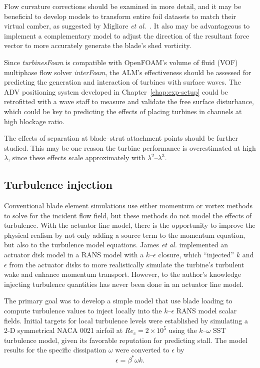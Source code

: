 Flow curvature corrections should be examined in more detail, and it may be
beneficial to develop models to transform entire foil datasets to match their
virtual camber, as suggested by Migliore \emph{et al.}~\cite{Migliore1980}. It
also may be advantageous to implement a complementary model to adjust the
direction of the resultant force vector to more accurately generate the blade's
shed vorticity.

Since \textit{turbinesFoam} is compatible with OpenFOAM's volume of fluid (VOF)
multiphase flow solver \textit{interFoam}, the ALM's effectiveness should be
assessed for predicting the generation and interaction of turbines with surface
waves. The ADV positioning system developed in Chapter~\ref{chap:exp-setup}
could be retrofitted with a wave staff to measure and validate the free surface
disturbance, which could be key to predicting the effects of placing turbines in
channels at high blockage ratio.

The effects of separation at blade--strut attachment points should be further
studied. This may be one reason the turbine performance is overestimated at high
$\lambda$, since these effects scale approximately with
$\lambda^2$--$\lambda^3$.


\subsection{Turbulence injection}

Conventional blade element simulations use either momentum or vortex methods to
solve for the incident flow field, but these methods do not model the effects of
turbulence. With the actuator line model, there is the opportunity to improve
the physical realism by not only adding a source term to the momentum equation,
but also to the turbulence model equations. James \emph{et al.} \cite{James2010}
implemented an actuator disk model in a RANS model with a $k$--$\epsilon$
closure, which ``injected'' $k$ and $\epsilon$ from the actuator disks to more
realistically simulate the turbine's turbulent wake and enhance momentum
transport. However, to the author's knowledge injecting turbulence quantities
has never been done in an actuator line model.

The primary goal was to develop a simple model that use blade loading to compute
turbulence values to inject locally into the $k$--$\epsilon$ RANS model scalar
fields. Initial targets for local turbulence levels were established by
simulating a 2-D symmetrical NACA 0021 airfoil at $Re_c = 2 \times 10^5$ using
the $k$--$\omega$ SST turbulence model, given its favorable reputation for
predicting stall. The model results for the specific dissipation $\omega$ were
converted to $\epsilon$ by \cite{Wilcox1994}
\begin{equation}
    \epsilon = \beta^* \omega k.
\end{equation}

